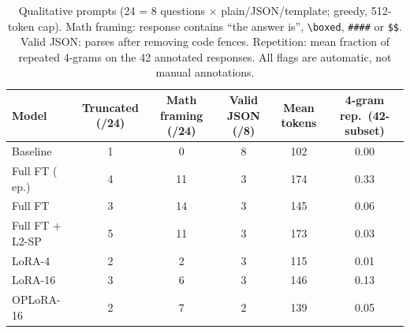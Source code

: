 \begin{table}[t]
\centering
\footnotesize
\setlength{\tabcolsep}{3.0pt}
\caption{Qualitative prompts (24 = 8 questions $\times$ plain/JSON/template; greedy, 512-token cap). Math framing: response contains ``the answer is'', \texttt{\textbackslash boxed}, \texttt{\#\#\#\#} or \texttt{\$\$}. Valid JSON: parses after removing code fences. Repetition: mean fraction of repeated 4-grams on the 42 annotated responses. All flags are automatic, not manual annotations.}
\label{tab:qual}
\begin{tabular}{lccccc}
\toprule
Model & Truncated (/24) & Math framing (/24) & Valid JSON (/8) & Mean tokens & 4-gram rep.\ (42-subset) \\
\midrule
Baseline & 1 & 0 & 8 & 102 & 0.00 \\
\midrule
Full FT (\textonehalf{} ep.) & 4 & 11 & 3 & 174 & 0.33 \\
Full FT & 3 & 14 & 3 & 145 & 0.06 \\
Full FT + L2-SP & 5 & 11 & 3 & 173 & 0.03 \\
LoRA-4 & 2 & 2 & 3 & 115 & 0.01 \\
LoRA-16 & 3 & 6 & 3 & 146 & 0.13 \\
OPLoRA-16 & 2 & 7 & 2 & 139 & 0.05 \\
\bottomrule
\end{tabular}
\end{table}
